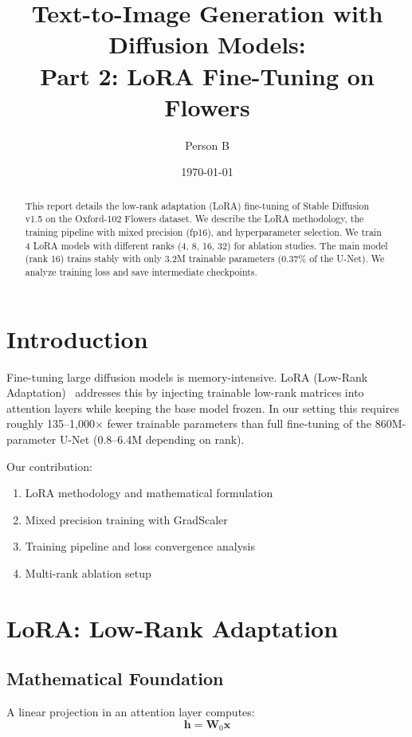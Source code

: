 \documentclass[11pt]{article}
\title{Text-to-Image Generation with Diffusion Models:\\
{\large Part 2: LoRA Fine-Tuning on Flowers}}
\author{Person B}
\date{\today}
\begin{document}
\maketitle

\begin{abstract}
This report details the low-rank adaptation (LoRA) fine-tuning of Stable Diffusion v1.5 on the Oxford-102 Flowers dataset. We describe the LoRA methodology, the training pipeline with mixed precision (fp16), and hyperparameter selection. We train 4 LoRA models with different ranks (4, 8, 16, 32) for ablation studies. The main model (rank 16) trains stably with only 3.2M trainable parameters (0.37\% of the U-Net). We analyze training loss and save intermediate checkpoints.
\end{abstract}

\section{Introduction}

Fine-tuning large diffusion models is memory-intensive. LoRA (Low-Rank Adaptation)~\cite{hu2021lora} addresses this by injecting trainable low-rank matrices into attention layers while keeping the base model frozen. In our setting this requires roughly 135--1,000$\times$ fewer trainable parameters than full fine-tuning of the 860M-parameter U-Net (0.8--6.4M depending on rank).

Our contribution:
\begin{enumerate}
    \item LoRA methodology and mathematical formulation
    \item Mixed precision training with GradScaler
    \item Training pipeline and loss convergence analysis
    \item Multi-rank ablation setup
\end{enumerate}

\section{LoRA: Low-Rank Adaptation}

\subsection{Mathematical Foundation}

A linear projection in an attention layer computes:
\begin{equation}
\mathbf{h} = \mathbf{W}_0 \mathbf{x}
\end{equation}
\end{document}
